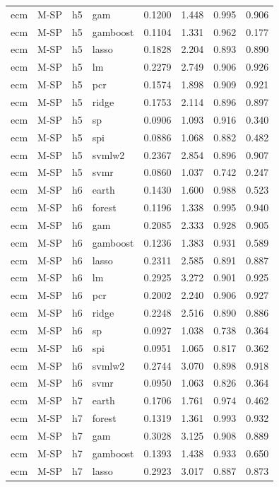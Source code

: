 \begin{ThreePartTable}
\begin{longtable}[t]{llclcccc}
ecm & M-SP & h5 & gam & 0.1200 & 1.448 & 0.995 & 0.906\\
ecm & M-SP & h5 & gamboost & 0.1104 & 1.331 & 0.962 & 0.177\\
ecm & M-SP & h5 & lasso & 0.1828 & 2.204 & 0.893 & 0.890\\
ecm & M-SP & h5 & lm & 0.2279 & 2.749 & 0.906 & 0.926\\
ecm & M-SP & h5 & pcr & 0.1574 & 1.898 & 0.909 & 0.921\\
ecm & M-SP & h5 & ridge & 0.1753 & 2.114 & 0.896 & 0.897\\
ecm & M-SP & h5 & sp & 0.0906 & 1.093 & 0.916 & 0.340\\
ecm & M-SP & h5 & spi & 0.0886 & 1.068 & 0.882 & 0.482\\
ecm & M-SP & h5 & svmlw2 & 0.2367 & 2.854 & 0.896 & 0.907\\
ecm & M-SP & h5 & svmr & 0.0860 & 1.037 & 0.742 & 0.247\\
\addlinespace
ecm & M-SP & h6 & earth & 0.1430 & 1.600 & 0.988 & 0.523\\
ecm & M-SP & h6 & forest & 0.1196 & 1.338 & 0.995 & 0.940\\
ecm & M-SP & h6 & gam & 0.2085 & 2.333 & 0.928 & 0.905\\
ecm & M-SP & h6 & gamboost & 0.1236 & 1.383 & 0.931 & 0.589\\
ecm & M-SP & h6 & lasso & 0.2311 & 2.585 & 0.891 & 0.887\\
ecm & M-SP & h6 & lm & 0.2925 & 3.272 & 0.901 & 0.925\\
ecm & M-SP & h6 & pcr & 0.2002 & 2.240 & 0.906 & 0.927\\
ecm & M-SP & h6 & ridge & 0.2248 & 2.516 & 0.890 & 0.886\\
ecm & M-SP & h6 & sp & 0.0927 & 1.038 & 0.738 & 0.364\\
ecm & M-SP & h6 & spi & 0.0951 & 1.065 & 0.817 & 0.362\\
ecm & M-SP & h6 & svmlw2 & 0.2744 & 3.070 & 0.898 & 0.918\\
ecm & M-SP & h6 & svmr & 0.0950 & 1.063 & 0.826 & 0.364\\
\addlinespace
ecm & M-SP & h7 & earth & 0.1706 & 1.761 & 0.974 & 0.462\\
ecm & M-SP & h7 & forest & 0.1319 & 1.361 & 0.993 & 0.932\\
ecm & M-SP & h7 & gam & 0.3028 & 3.125 & 0.908 & 0.889\\
ecm & M-SP & h7 & gamboost & 0.1393 & 1.438 & 0.933 & 0.650\\
ecm & M-SP & h7 & lasso & 0.2923 & 3.017 & 0.887 & 0.873\\

\end{longtable}
\end{ThreePartTable}
